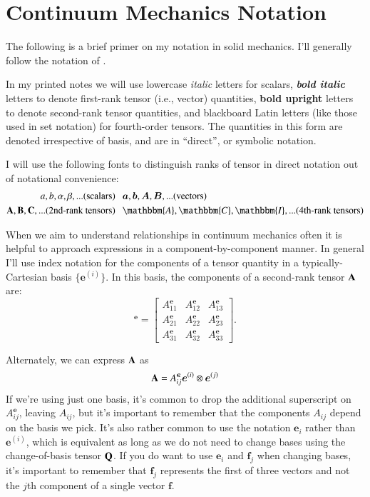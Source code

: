 \section*{Continuum Mechanics Notation} 

The following is a brief primer on my notation in solid mechanics. 
I'll generally follow the notation of \citet{holzapfelNonlinearSolidMechanics2002}. 
 
In my printed notes we will use lowercase \textit{italic} letters for scalars, \textit{\textbf{bold italic}} letters to denote first-rank tensor (i.e., vector) quantities, \textbf{bold upright} letters to denote second-rank tensor quantities, and blackboard Latin letters (like those used in set notation) for fourth-order tensors. 
The quantities in this form are denoted irrespective of basis, and are in ``direct'', or symbolic notation. 

\noindent I will use the following fonts to distinguish ranks of tensor in direct notation out of notational convenience:
\begin{eqnarray*}
a, b, \alpha, \beta, ... (\textrm{scalars}) & ~~~ \bm{a}, \bm{b}, \bm{A}, \bm{B}, ... (\textrm{vectors})\\
\mathbf{A}, \mathbf{B}, \mathbf{C}, ...(\textrm{2nd-rank tensors}) & ~~~ \mathbbm{A}, \mathbbm{C}, \mathbbm{I},... (\textrm{4th-rank tensors})
\end{eqnarray*}
    
When we aim to understand relationships in continuum mechanics often it is helpful to approach expressions in a component-by-component manner. 
In general I'll use index notation for the components of a tensor quantity in a typically-Cartesian basis $\{\bm{e}^{(i)}\}$. 
In this basis, the components of a second-rank tensor $\mathbf{A}$ are:
\begin{equation*}
    [\bn{A}]^{\bm{e}} = \begin{bmatrix}
A_{11}^{\bm{e}}  & A_{12}^{\bm{e}}  & A_{13}^{\bm{e}} \\
A_{21}^{\bm{e}}  & A_{22}^{\bm{e}}  & A_{23}^{\bm{e}} \\
A_{31}^{\bm{e}}  & A_{32}^{\bm{e}}  & A_{33}^{\bm{e}} 
\end{bmatrix}.
\end{equation*}

Alternately, we can express $\mathbf{A}$ as
\begin{equation*}
    \mathbf{A} = A_{ij}^{\bm{e}} \bm{e}^{(i)} \otimes \bm{e}^{(j)}
\end{equation*}
If we're using just one basis, it's common to drop the additional superscript on $A_{ij}^{\bm{e}}$, leaving $A_{ij}$, but it's important to remember that the components $A_{ij}$ depend on the basis we pick.
It's also rather common to use the notation $\bm{e}_i$ rather than $\bm{e}^{(i)}$, which is equivalent as long as we do not need to change bases using the change-of-basis tensor $\mathbf{Q}$. 
If you do want to use $\bm{e}_i$ and $\bm{f}_j$ when changing bases, it's important to remember that $\bm{f}_j$ represents the first of three vectors and not the $j$th component of a single vector $\bm{f}$. 


